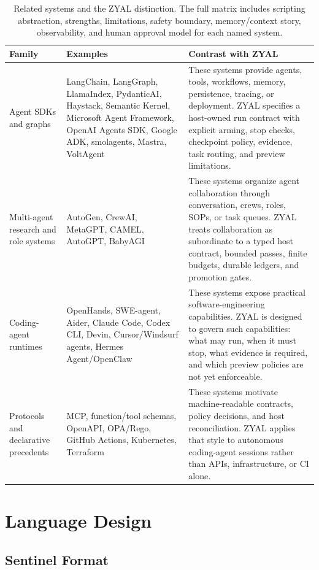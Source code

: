 \documentclass[conference]{IEEEtran}
\newcommand{\ZYAL}{ZYAL}
\begin{document}
\begin{table}[t]
\centering
\caption{Related systems and the \ZYAL{} distinction. The full matrix includes scripting abstraction, strengths, limitations, safety boundary, memory/context story, observability, and human approval model for each named system.}
\label{tab:related}
\footnotesize
\begin{tabularx}{\textwidth}{p{27mm}p{39mm}X}
\toprule
Family & Examples & Contrast with \ZYAL{} \\
\midrule
Agent SDKs and graphs & LangChain, LangGraph, LlamaIndex, PydanticAI, Haystack, Semantic Kernel, Microsoft Agent Framework, OpenAI Agents SDK, Google ADK, smolagents, Mastra, VoltAgent & These systems provide agents, tools, workflows, memory, persistence, tracing, or deployment. \ZYAL{} specifies a host-owned run contract with explicit arming, stop checks, checkpoint policy, evidence, task routing, and preview limitations. \\
\midrule
Multi-agent research and role systems & AutoGen, CrewAI, MetaGPT, CAMEL, AutoGPT, BabyAGI & These systems organize agent collaboration through conversation, crews, roles, SOPs, or task queues. \ZYAL{} treats collaboration as subordinate to a typed host contract, bounded passes, finite budgets, durable ledgers, and promotion gates. \\
\midrule
Coding-agent runtimes & OpenHands, SWE-agent, Aider, Claude Code, Codex CLI, Devin, Cursor/Windsurf agents, Hermes Agent/OpenClaw & These systems expose practical software-engineering capabilities. \ZYAL{} is designed to govern such capabilities: what may run, when it must stop, what evidence is required, and which preview policies are not yet enforceable. \\
\midrule
Protocols and declarative precedents & MCP, function/tool schemas, OpenAPI, OPA/Rego, GitHub Actions, Kubernetes, Terraform & These systems motivate machine-readable contracts, policy decisions, and host reconciliation. \ZYAL{} applies that style to autonomous coding-agent sessions rather than APIs, infrastructure, or CI alone. \\
\bottomrule
\end{tabularx}
\end{table}

\section{Language Design}

\subsection{Sentinel Format}
\end{document}

